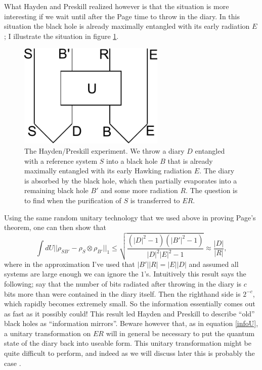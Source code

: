 \documentclass[12pt]{article}
\newcommand{\be}{\begin{equation}}
\newcommand{\ee}{\end{equation}}
\begin{document}
What Hayden and Preskill realized however is that the situation is more interesting if we wait until after the Page time to throw in the diary.  In this situation the black hole is already maximally entangled with its early radiation $E$; I illustrate the situation in figure \ref{hpfig}.
\begin{figure}
\begin{center}
\includegraphics[height=5cm]{hpfig.pdf}
\caption{The Hayden/Preskill experiment.  We throw a diary $D$ entangled with a reference system $S$ into a black hole $B$ that is already maximally entangled with its early Hawking radiation $E$.  The diary is absorbed by the black hole, which then partially evaporates into a remaining black hole $B'$ and some more radiation $R$.  The question is to find when the purification of $S$ is transferred to $ER$.}\label{hpfig}
\end{center}
\end{figure}
Using the same random unitary technology that we used above in proving Page's theorem, one can then show that \cite{Hayden:2007cs}
\be\label{hpresult}
\int dU ||\rho_{SB'}-\rho_S\otimes \rho_{B'}||_1\leq \sqrt{\frac{(|D|^2-1)(|B'|^2-1)}{|D|^2|E|^2-1}}\approx \frac{|D|}{|R|},
\ee
where in the approximation I've used that $|B'||R|=|E||D|$ and assumed all systems are large enough we can ignore the $1$'s.  Intuitively this result says the following; say that the number of bits radiated after throwing in the diary is $c$ bits more than were contained in the diary itself.  Then the righthand side is $2^{-c}$, which rapidly becomes extremely small.  So the information essentially comes out as fast as it possibly could!  This result led Hayden and Preskill to describe ``old'' black holes as ``information mirrors''.  Beware however that, as in equation \eqref{infoU}, a unitary transformation on $ER$ will in general be necessary to put the quantum state of the diary back into useable form.  This unitary transformation might be quite difficult to perform, and indeed as we will discuss later this is probably the case \cite{Harlow:2013tf}.  
\end{document}
